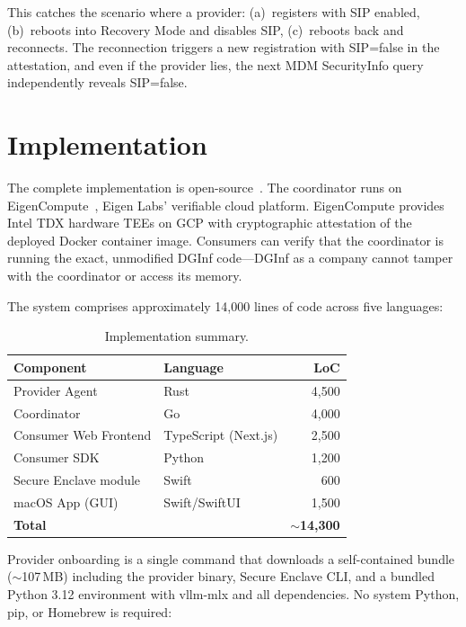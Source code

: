 \documentclass[10pt,twocolumn,letterpaper]{article}
\begin{document}
This catches the scenario where a provider: (a)~registers with SIP enabled, (b)~reboots into Recovery Mode and disables SIP, (c)~reboots back and reconnects. The reconnection triggers a new registration with SIP=false in the attestation, and even if the provider lies, the next MDM SecurityInfo query independently reveals SIP=false.

\section{Implementation}

The complete implementation is open-source~\cite{dginf-repo}. The coordinator runs on EigenCompute~\cite{eigencloud}, Eigen Labs' verifiable cloud platform. EigenCompute provides Intel TDX hardware TEEs on GCP with cryptographic attestation of the deployed Docker container image. Consumers can verify that the coordinator is running the exact, unmodified DGInf code---DGInf as a company cannot tamper with the coordinator or access its memory.

The system comprises approximately 14,000 lines of code across five languages:

\begin{table}[h]
\centering
\caption{Implementation summary.}
\vspace{4pt}
\small
\begin{tabular}{@{}llr@{}}
\toprule
\textbf{Component} & \textbf{Language} & \textbf{LoC} \\
\midrule
Provider Agent & Rust & 4,500 \\
Coordinator & Go & 4,000 \\
Consumer Web Frontend & TypeScript (Next.js) & 2,500 \\
Consumer SDK & Python & 1,200 \\
Secure Enclave module & Swift & 600 \\
macOS App (GUI) & Swift/SwiftUI & 1,500 \\
\midrule
\textbf{Total} && \textbf{$\sim$14,300} \\
\bottomrule
\end{tabular}
\end{table}

Provider onboarding is a single command that downloads a self-contained bundle ($\sim$107\,MB) including the provider binary, Secure Enclave CLI, and a bundled Python 3.12 environment with vllm-mlx and all dependencies. No system Python, pip, or Homebrew is required:
\end{document}

